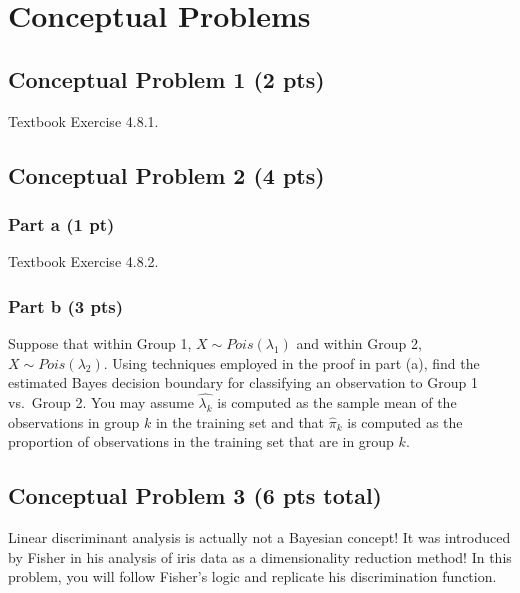 \documentclass[
]{article}
\begin{document}
\hypertarget{conceptual-problems}{%
\section{Conceptual Problems}\label{conceptual-problems}}

\hypertarget{conceptual-problem-1-2-pts}{%
\subsection{Conceptual Problem 1 (2
pts)}\label{conceptual-problem-1-2-pts}}

Textbook Exercise 4.8.1.

\hypertarget{conceptual-problem-2-4-pts}{%
\subsection{Conceptual Problem 2 (4
pts)}\label{conceptual-problem-2-4-pts}}

\hypertarget{part-a-1-pt}{%
\subsubsection{Part a (1 pt)}\label{part-a-1-pt}}

Textbook Exercise 4.8.2.

\hypertarget{part-b-3-pts}{%
\subsubsection{Part b (3 pts)}\label{part-b-3-pts}}

Suppose that within Group 1, \(X \sim Pois(\lambda_1)\) and within Group
2, \(X \sim Pois(\lambda_2)\). Using techniques employed in the proof in
part (a), find the estimated Bayes decision boundary for classifying an
observation to Group 1 vs.~Group 2. You may assume \(\hat{\lambda_k}\)
is computed as the sample mean of the observations in group \(k\) in the
training set and that \(\hat{\pi}_k\) is computed as the proportion of
observations in the training set that are in group \(k\).

\hypertarget{conceptual-problem-3-6-pts-total}{%
\subsection{Conceptual Problem 3 (6 pts
total)}\label{conceptual-problem-3-6-pts-total}}

Linear discriminant analysis is actually not a Bayesian concept! It was
introduced by Fisher in his analysis of iris data as a dimensionality
reduction method! In this problem, you will follow Fisher's logic and
replicate his discrimination function.
\end{document}
